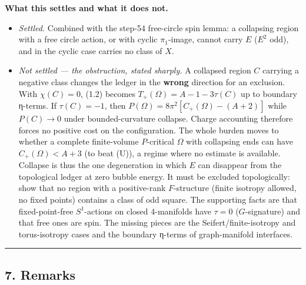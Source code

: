 \documentclass[
  10pt,
]{report}
\providecommand{\tightlist}{%
  \setlength{\itemsep}{0pt}\setlength{\parskip}{0pt}}
\begin{document}
\textbf{What this settles and what it does not.}

\begin{itemize}
\tightlist
\item
  \emph{Settled.} Combined with the step-54 free-circle spin lemma: a
  collapsing region with a free circle action, or with cyclic
  \(\pi_1\)-image, cannot carry \(E\) (\(E^2\) odd), and in the cyclic
  case carries no class of \(X\).
\item
  \emph{Not settled --- the obstruction, stated sharply.} A collapsed
  region \(C\) carrying a negative class changes the ledger in the
  \textbf{wrong} direction for an exclusion. With \(\chi(C)=0\), (1.2)
  becomes \(T_+(\Omega)=A-1-3\tau(C)\) up to boundary η-terms. If
  \(\tau(C)=-1\), then \(P(\Omega)=8\pi^2[C_+(\Omega)-(A+2)]\) while
  \(P(C)\to0\) under bounded-curvature collapse. Charge accounting
  therefore forces no positive cost on the configuration. The whole
  burden moves to whether a complete finite-volume \(P\)-critical
  \(\Omega\) with collapsing ends can have \(C_+(\Omega)<A+3\) (to beat
  (U)), a regime where no estimate is available. Collapse is thus the
  one degeneration in which \(E\) can disappear from the topological
  ledger at zero bubble energy. It must be excluded topologically: show
  that no region with a positive-rank \(F\)-structure (finite isotropy
  allowed, no fixed points) contains a class of odd square. The
  supporting facts are that fixed-point-free \(S^1\)-actions on closed
  4-manifolds have \(\tau=0\) (\(G\)-signature) and that free ones are
  spin. The missing pieces are the Seifert/finite-isotropy and
  torus-isotropy cases and the boundary η-terms of graph-manifold
  interfaces.
\end{itemize}

\begin{center}\rule{0.5\linewidth}{0.5pt}\end{center}

\hypertarget{remarks}{%
\subsection{7. Remarks}\label{remarks}}
\end{document}
